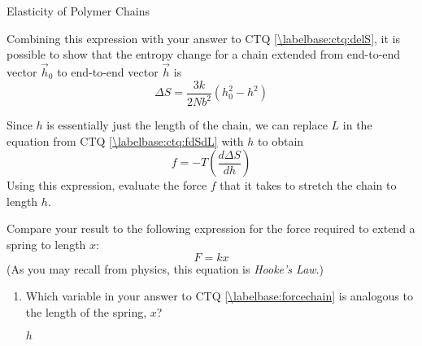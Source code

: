 \begin{activity}{Elasticity of Polymer Chains}
\begin{infobox}
	Combining this expression with your answer to CTQ \ref{\labelbase:ctq:delS}, it is possible to show that the entropy change for a chain extended from end-to-end vector $\vec h_0$ to end-to-end vector $\vec h$ is
	\begin{equation*}
		\Delta S = \frac{3 k}{2 Nb^2}\left( h_0^2 - h^2 \right)
	\end{equation*}
	
\end{infobox}

\begin{ctqs}
	
	\question Since $h$ is essentially just the length of the chain, we can replace $L$ in the equation from CTQ \ref{\labelbase:ctq:fdSdL} with $h$ to obtain
		\begin{equation*}
			f = -T\left(\frac{d\Delta S}{dh}\right)
		\end{equation*}
		Using this expression, evaluate the force $f$ that it takes to stretch the chain to length $h$.
		\label{\labelbase:forcechain}
		
		\begin{solution}[2.5in]\end{solution}
		
	\question Compare your result to the following expression for the force required to extend a spring to length $x$:
		\begin{equation*}
			F = kx
		\end{equation*}
		(As you may recall from physics, this equation is \emph{Hooke's Law}.)
		
		\begin{enumerate}
			\item Which variable in your answer to CTQ \ref{\labelbase:forcechain} is analogous to the length of the spring, $x$?
		
				\begin{solution}[0.75in]
					$h$
				\end{solution}
			

\end{enumerate}
\end{ctqs}
\end{activity}
